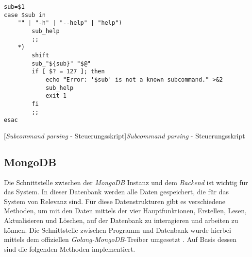 \begin{verbatim}
sub=$1
case $sub in
	"" | "-h" | "--help" | "help")
		sub_help
		;;
	*)
		shift
		sub_"${sub}" "$@"
		if [ $? = 127 ]; then
			echo "Error: '$sub' is not a known subcommand." >&2
			sub_help
			exit 1
		fi
		;;
esac
\end{verbatim}
[\textit{Subcommand parsing} - Steuerungsskript]{\textit{Subcommand parsing} - Steuerungsskript \cite{shgist}}
\label{code:subcommands}

\newpage

\subsection{MongoDB}

Die Schnittstelle zwischen der \textit{MongoDB} Instanz und dem \textit{Backend} ist wichtig für das System. In dieser Datenbank werden alle Daten gespeichert, die für das System von Relevanz sind. Für diese Datenstrukturen gibt es verschiedene Methoden, um mit den Daten mittels der vier Hauptfunktionen, Erstellen, Lesen, Aktualisieren und Löschen, auf der Datenbank zu interagieren und arbeiten zu können. Die Schnittstelle zwischen Programm und Datenbank wurde hierbei mittels dem offiziellen \textit{Golang-MongoDB}-Treiber umgesetzt \cite{mongogo}. Auf Basis dessen sind die folgenden Methoden implementiert.

